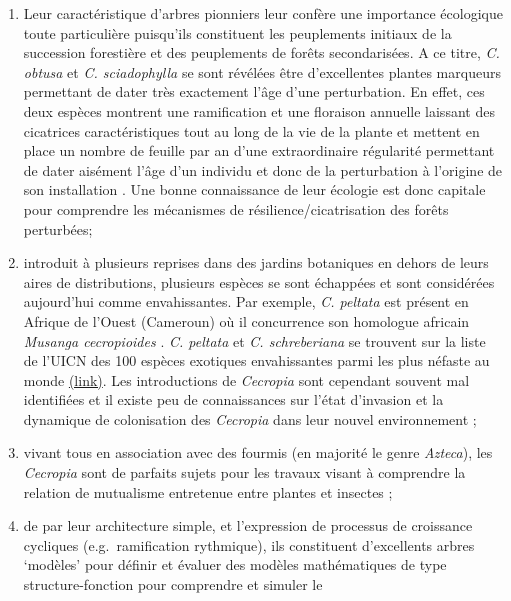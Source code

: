\documentclass[a4paper]{article}
\theoremstyle{definition}
\theoremstyle{definition}
\theoremstyle{definition}
\theoremstyle{remark}
\begin{document}
\begin{enumerate}
\def\labelenumi{(\roman{enumi})}
\item
  Leur caractéristique d'arbres pionniers leur confère une importance
  écologique toute particulière puisqu'ils constituent les peuplements
  initiaux de la succession forestière et des peuplements de forêts
  secondarisées. A ce titre, \emph{C. obtusa} et \emph{C. sciadophylla}
  se sont révélées être d'excellentes plantes marqueurs permettant de
  dater très exactement l'âge d'une perturbation. En effet, ces deux
  espèces montrent une ramification et une floraison annuelle laissant
  des cicatrices caractéristiques tout au long de la vie de la plante et
  mettent en place un nombre de feuille par an d'une extraordinaire
  régularité permettant de dater aisément l'âge d'un individu et donc de
  la perturbation à l'origine de son installation
  \citep{Davis1970, Heuret2002, Zalamea2008, Zalamea2009} . Une bonne
  connaissance de leur écologie est donc capitale pour comprendre les
  mécanismes de résilience/cicatrisation des forêts perturbées;
\item
  introduit à plusieurs reprises dans des jardins botaniques en dehors
  de leurs aires de distributions, plusieurs espèces se sont échappées
  et sont considérées aujourd'hui comme envahissantes. Par exemple,
  \emph{C. peltata} est présent en Afrique de l'Ouest (Cameroun) où il
  concurrence son homologue africain \emph{Musanga cecropioides}
  \citep{McKey1988}. \emph{C. peltata} et \emph{C. schreberiana} se
  trouvent sur la liste de l'UICN des 100 espèces exotiques
  envahissantes parmi les plus néfaste au monde
  \href{http://www.issg.org/database/welcome/}{(link)}. Les
  introductions de \emph{Cecropia} sont cependant souvent mal
  identifiées et il existe peu de connaissances sur l'état d'invasion et
  la dynamique de colonisation des \emph{Cecropia} dans leur nouvel
  environnement \citep{Webber2011};
\item
  vivant tous en association avec des fourmis (en majorité le genre
  \emph{Azteca}), les \emph{Cecropia} sont de parfaits sujets pour les
  travaux visant à comprendre la relation de mutualisme entretenue entre
  plantes et insectes
  \citep{Janzen1973, Folgarait1994, Gianoli2008, Dejean2009};
\item
  de par leur architecture simple, et l'expression de processus de
  croissance cycliques (e.g.~ramification rythmique), ils constituent
  d'excellents arbres `modèles' pour définir et évaluer des modèles
  mathématiques de type structure-fonction pour comprendre et simuler le

\end{enumerate}
\end{document}
